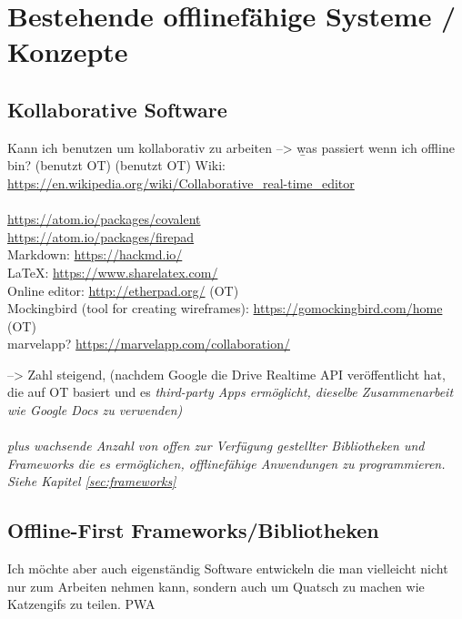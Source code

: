 \chapter{\label{chap:state}Bestehende offlinefähige Systeme / Konzepte}
%
%
\section{Kollaborative Software}
Kann ich benutzen um kollaborativ zu arbeiten --> \b{was passiert wenn ich offline bin?}
(benutzt OT)
(benutzt OT)
Wiki: \url{https://en.wikipedia.org/wiki/Collaborative_real-time_editor}\\\\
\url{https://atom.io/packages/covalent}\\
\url{https://atom.io/packages/firepad}\\
Markdown: \url{https://hackmd.io/}\\
LaTeX: \url{https://www.sharelatex.com/}\\
Online editor: \url{http://etherpad.org/} (OT)\\
Mockingbird (tool for creating wireframes): \url{https://gomockingbird.com/home} (OT)\\
marvelapp? \url{https://marvelapp.com/collaboration/}

--> Zahl steigend, (nachdem Google die Drive Realtime API veröffentlicht hat, die auf \gls{OT} basiert und es \it{third-party Apps} ermöglicht, dieselbe Zusammenarbeit wie Google Docs zu verwenden)\\\\
\b{plus} wachsende Anzahl von offen zur Verfügung gestellter Bibliotheken und Frameworks die es ermöglichen, offlinefähige Anwendungen zu programmieren. Siehe Kapitel \ref{sec:frameworks}
%
%
\section{\label{sec:frameworks}Offline-First Frameworks/Bibliotheken}
Ich möchte aber auch eigenständig Software entwickeln die man vielleicht nicht nur zum Arbeiten nehmen kann, sondern auch um Quatsch zu machen wie Katzengifs zu teilen.
\Gls{PWA}
%
%

%
%
%
%


%
%


%
%


%
%

